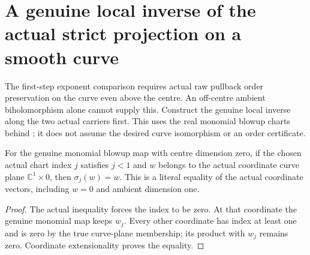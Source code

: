 \section{A genuine local inverse of the actual strict projection on a smooth curve}

The first-step exponent comparison requires actual raw pullback order
preservation on the curve even above the centre. An off-centre ambient
biholomorphism alone cannot supply this. Construct the genuine local inverse
along the two actual carriers first. This uses the real monomial blowup
charts behind \cite[Proposition 3.13 and Remark 12.6]{bierstone-milman97-invent-math};
it does not assume the desired curve isomorphism or an order certificate.

\begin{lemma}
\label{hir:sharp-actual-zero-centre-monomial-curve-plane-identity}
\leanok
For the genuine monomial blowup map with centre dimension zero, if the
chosen actual chart index $j$ satisfies $j<1$ and $w$ belongs to the
actual coordinate curve plane $\mathbb C^1\times0$, then $\sigma_j(w)=w$.
This is a literal equality of the actual coordinate vectors, including
$w=0$ and ambient dimension one.
\end{lemma}
\begin{proof}
The actual inequality forces the index to be zero. At that coordinate
the genuine monomial map keeps $w_j$. Every other coordinate has index
at least one and is zero by the true curve-plane membership; its product
with $w_j$ remains zero. Coordinate extensionality proves the equality.
\end{proof}

